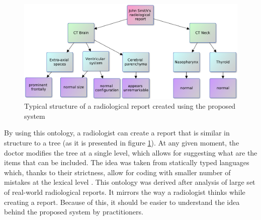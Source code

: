 \documentclass[12pt, twoside, openany]{report}
\theoremstyle{definition}
\begin{document}
\begin{figure}
    \centering
    \includegraphics[width=\linewidth]{report-tree.pdf}
    \caption{Typical structure of a radiological report created using the proposed system\protect\footnotemark[1]} 
    \label{fig:report-tree}
\end{figure}


By using this ontology, a radiologist can create a report that is similar in structure to a tree (as it is presented in figure \ref{fig:report-tree}). At any given moment, the doctor modifies the tree at a single level, which allows for suggesting what are the items that can be included. The idea was taken from statically typed languages which, thanks to their strictness, allow for coding with smaller number of mistakes at the lexical level \cite{static-lang}. This ontology was derived after analysis of large set of real-world radiological reports. It mirrors the way a radiologist thinks while creating a report. Because of this, it should be easier to understand the idea behind the proposed system by practitioners.
\end{document}
